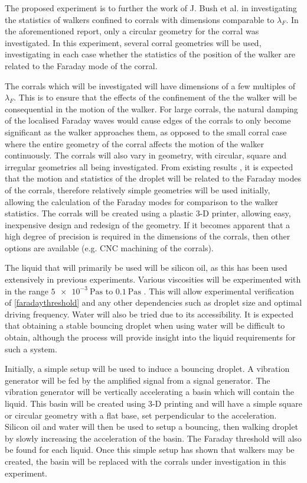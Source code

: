\documentclass[11pt]{article}
\begin{document}
The proposed experiment is to further the work of J. Bush et al. \cite{12} in investigating the statistics of walkers confined to corrals with dimensions comparable to $\lambda_F$.  In the aforementioned report, only a circular geometry for the corral was investigated.  In this experiment, several corral geometries will be used, investigating in each case whether the statistics of the position of the walker are related to the Faraday mode of the corral.

The corrals which will be investigated will have dimensions of a few multiples of $\lambda_F$.  This is to ensure that the effects of the confinement of the the walker will be consequential in the motion of the walker.  For large corrals, the natural damping of the localised Faraday waves would cause edges of the corrals to only become significant as the walker approaches them, as opposed to the small corral case where the entire geometry of the corral affects the motion of the walker continuously.
The corrals will also vary in geometry, with circular, square and irregular geometries all being investigated.  From existing results \cite{12}, it is expected that the motion and statistics of the droplet will be related to the Faraday modes of the corrals, therefore relatively simple geometries will be used initially, allowing the calculation of the Faraday modes for comparison to the walker statistics.  The corrals will be created using a plastic 3-D printer, allowing easy, inexpensive design and redesign of the geometry.  If it becomes apparent that a high degree of precision is required in the dimensions of the corrals, then other options are available (e.g. CNC machining of the corrals).

The liquid that will primarily be used will be silicon oil, as this has been used extensively in previous experiments.  Various viscosities will be experimented with in the range $\SI{5e-3}{\pascal\second}$ to $\SI{0.1}{\pascal\second}$ \cite{9}.  This will allow experimental verification of \eqref{faradaythreshold} and any other dependencies such as droplet size and optimal driving frequency.
Water will also be tried due to its accessibility.  It is expected that obtaining a stable bouncing droplet when using water will be difficult to obtain, although the process will provide insight into the liquid requirements for such a system.

Initially, a simple setup will be used to induce a bouncing droplet.  A vibration generator will be fed by the amplified signal from a signal generator.  The vibration generator will be vertically accelerating a basin which will contain the liquid.  This basin will be created using 3-D printing and will have a simple square or circular geometry with a flat base, set perpendicular to the acceleration.  Silicon oil and water will then be used to setup a bouncing, then walking droplet by slowly increasing the acceleration of the basin.  The Faraday threshold will also be found for each liquid.  Once this simple setup has shown that walkers may be created, the basin will be replaced with the corrals under investigation in this experiment.
\end{document}
